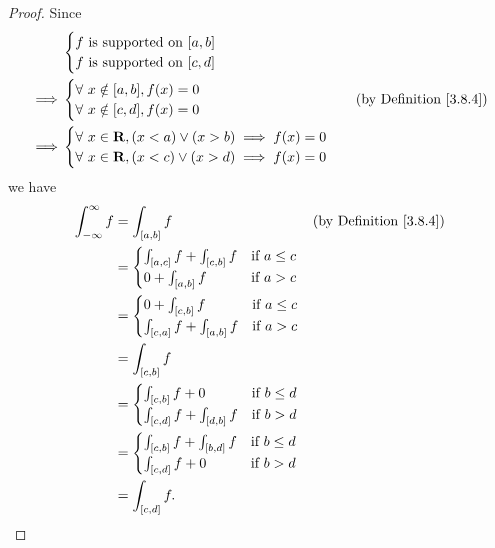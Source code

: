 \begin{proof}
    Since
    \begin{align*}
                 & \begin{cases}
            f \text{ is supported on } [a, b] \\
            f \text{ is supported on } [c, d]
        \end{cases}                                       \\
        \implies & \begin{cases}
            \forall\ x \notin [a, b], f(x) = 0 \\
            \forall\ x \notin [c, d], f(x) = 0
        \end{cases} & \text{(by Definition \ref{3.8.4})} \\
        \implies & \begin{cases}
            \forall\ x \in \mathbf{R}, (x < a) \lor (x > b) \implies f(x) = 0 \\
            \forall\ x \in \mathbf{R}, (x < c) \lor (x > d) \implies f(x) = 0
        \end{cases}
    \end{align*}
    we have
    \begin{align*}
        \int_{-\infty}^\infty f & = \int_{[a, b]} f            & \text{(by Definition \ref{3.8.4})} \\
                                & = \begin{cases}
            \int_{[a, c]} f + \int_{[c, b]} f & \text{if } a \leq c \\
            0 + \int_{[a, b]} f               & \text{if } a > c
        \end{cases}                                      \\
                                & = \begin{cases}
            0 + \int_{[c, b]} f               & \text{if } a \leq c \\
            \int_{[c, a]} f + \int_{[a, b]} f & \text{if } a > c
        \end{cases}                                      \\
                                & = \int_{[c, b]} f                                                 \\
                                & = \begin{cases}
            \int_{[c, b]} f + 0               & \text{if } b \leq d \\
            \int_{[c, d]} f + \int_{[d, b]} f & \text{if } b > d
        \end{cases}                                      \\
                                & = \begin{cases}
            \int_{[c, b]} f + \int_{[b, d]} f & \text{if } b \leq d \\
            \int_{[c, d]} f + 0               & \text{if } b > d
        \end{cases}                                      \\
                                & = \int_{[c, d]} f.
    \end{align*}
\end{proof}

